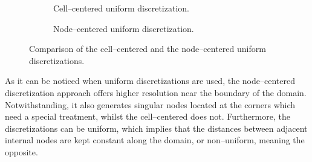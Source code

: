\begin{figure}[h]
	\centering
	\begin{subfigure}{.5\textwidth}
		\centering
		\caption{Cell--centered uniform discretization.}
		\label{fig:face_node_centered_discretization_comparison_1}
	\end{subfigure}%
	\begin{subfigure}{.5\textwidth}
		\centering
		\caption{Node--centered uniform discretization.}
		\label{fig:face_node_centered_discretization_comparison_2}
	\end{subfigure}
	\caption{Comparison of the cell--centered and the node--centered uniform discretizations.}
	\label{fig:face_node_centered_discretization_comparison}
\end{figure}

\noindent
As it can be noticed when uniform discretizations are used, the node--centered
discretization approach offers higher resolution near the boundary of the
domain. Notwithstanding, it also generates singular nodes located at the corners
which need a special treatment, whilst the cell--centered does not. Furthermore,
the discretizations can be uniform, which implies that the distances between
adjacent internal nodes are kept constant along the domain, or non--uniform,
meaning the opposite.

